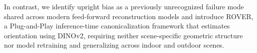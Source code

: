 In contrast, we identify upright bias as a previously unrecognized failure mode shared across modern feed-forward reconstruction models and introduce ROVER, a Plug-and-Play inference-time canonicalization framework that estimates orientation using DINOv2, requiring neither scene-specific geometric structure nor model retraining and generalizing across indoor and outdoor scenes.








